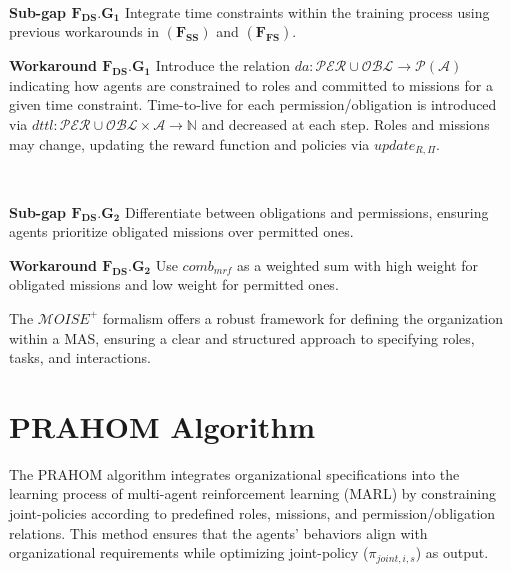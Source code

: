 \documentclass[conference]{IEEEtran}
\newcounter{relation}
\begin{document}
\

\textbf{Sub-gap $\mathbf{F_{DS}.G_1}$} \quad Integrate time constraints within the training process using previous workarounds in $(\mathbf{F_{SS}})$ and $(\mathbf{F_{FS}})$.

\textbf{Workaround $\mathbf{F_{DS}.G_1}$} \quad Introduce the relation $da: \mathcal{PER} \cup \mathcal{OBL} \rightarrow \mathcal{P}(\mathcal{A})$ indicating how agents are constrained to roles and committed to missions for a given time constraint. Time-to-live for each permission/obligation is introduced via $dttl: \mathcal{PER} \cup \mathcal{OBL} \times \mathcal{A} \rightarrow \mathbb{N}$ and decreased at each step. Roles and missions may change, updating the reward function and policies via $update_{R,\Pi}$.

\

\textbf{Sub-gap $\mathbf{F_{DS}.G_2}$} \quad Differentiate between obligations and permissions, ensuring agents prioritize obligated missions over permitted ones.

\textbf{Workaround $\mathbf{F_{DS}.G_2}$} \quad Use $comb_{mrf}$ as a weighted sum with high weight for obligated missions and low weight for permitted ones.


The $\mathcal{M}OISE^+$ formalism offers a robust framework for defining the organization within a MAS, ensuring a clear and structured approach to specifying roles, tasks, and interactions.




\section{PRAHOM Algorithm}\label{sec:prahom_theory}



The PRAHOM algorithm integrates organizational specifications into the learning process of multi-agent reinforcement learning (MARL) by constraining joint-policies according to predefined roles, missions, and permission/obligation relations. This method ensures that the agents' behaviors align with organizational requirements while optimizing joint-policy ($\pi_{joint,i,s}$) as output.
\end{document}
